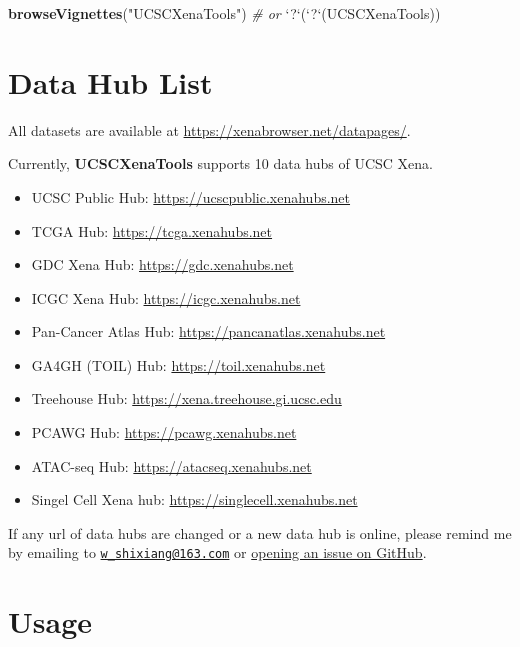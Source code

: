 \documentclass[nofonts,]{tufte-handout}
\newenvironment{Shaded}{\begin{snugshade}}{\end{snugshade}}
\newcommand{\CommentTok}[1]{\textcolor[rgb]{0.56,0.35,0.01}{\textit{#1}}}
\newcommand{\DataTypeTok}[1]{\textcolor[rgb]{0.13,0.29,0.53}{#1}}
\newcommand{\KeywordTok}[1]{\textcolor[rgb]{0.13,0.29,0.53}{\textbf{#1}}}
\newcommand{\NormalTok}[1]{#1}
\newcommand{\StringTok}[1]{\textcolor[rgb]{0.31,0.60,0.02}{#1}}
\providecommand{\tightlist}{%
  \setlength{\itemsep}{0pt}\setlength{\parskip}{0pt}}
\begin{document}
\begin{Shaded}
\begin{Highlighting}[]
\KeywordTok{browseVignettes}\NormalTok{(}\StringTok{"UCSCXenaTools"}\NormalTok{)}
\CommentTok{# or}
\StringTok{`}\DataTypeTok{?}\StringTok{`}\NormalTok{(}\StringTok{`}\DataTypeTok{?}\StringTok{`}\NormalTok{(UCSCXenaTools))}
\end{Highlighting}
\end{Shaded}

\hypertarget{data-hub-list}{%
\section{Data Hub List}\label{data-hub-list}}

All datasets are available at \url{https://xenabrowser.net/datapages/}.

Currently, \textbf{UCSCXenaTools} supports 10 data hubs of UCSC Xena.

\begin{itemize}
\tightlist
\item
  UCSC Public Hub: \url{https://ucscpublic.xenahubs.net}
\item
  TCGA Hub: \url{https://tcga.xenahubs.net}
\item
  GDC Xena Hub: \url{https://gdc.xenahubs.net}
\item
  ICGC Xena Hub: \url{https://icgc.xenahubs.net}
\item
  Pan-Cancer Atlas Hub: \url{https://pancanatlas.xenahubs.net}
\item
  GA4GH (TOIL) Hub: \url{https://toil.xenahubs.net}
\item
  Treehouse Hub: \url{https://xena.treehouse.gi.ucsc.edu}
\item
  PCAWG Hub: \url{https://pcawg.xenahubs.net}
\item
  ATAC-seq Hub: \url{https://atacseq.xenahubs.net}
\item
  Singel Cell Xena hub: \url{https://singlecell.xenahubs.net}
\end{itemize}

If any url of data hubs are changed or a new data hub is online, please
remind me by emailing to
\href{mailto:w_shixiang@163.com}{\nolinkurl{w\_shixiang@163.com}} or
\href{https://github.com/ShixiangWang/UCSCXenaTools/issues}{opening an
issue on GitHub}.

\hypertarget{usage}{%
\section{Usage}\label{usage}}
\end{document}

